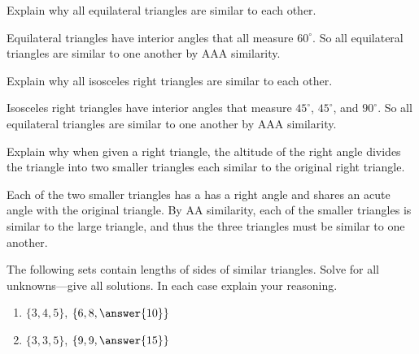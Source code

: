 \documentclass[nooutcomes]{ximera}
\begin{document}
\begin{question}
Explain why all equilateral triangles are similar to each other.
\begin{freeResponse}
\end{freeResponse}
\begin{hint}
Equilateral triangles have interior angles that all measure $60^\circ$.  So all equilateral triangles are similar to one another by AAA similarity.  
\end{hint}
\end{question}

\begin{question}Explain why all isosceles right triangles are similar to each other. 
\begin{freeResponse}
\end{freeResponse}
\begin{hint}
Isosceles right triangles have interior angles that measure $45^\circ$, $45^\circ$, and $90^\circ$.  So all equilateral triangles are similar to one another by AAA similarity.  
\end{hint}
\end{question}

\begin{question}
Explain why when given a right triangle, the altitude of the
  right angle divides the triangle into two smaller triangles each
  similar to the original right triangle.
\begin{freeResponse}
\end{freeResponse}
\begin{hint}
Each of the two smaller triangles has a has a right angle and shares an acute angle with the original triangle.  By AA similarity, each of the smaller triangles is similar to the large triangle, and thus the three triangles must be similar to one another.  
\end{hint}
\end{question}

\begin{question}
The following sets contain lengths of sides of similar
  triangles. Solve for all unknowns---give all solutions. In each case
  explain your reasoning.
\begin{enumerate}
\item $\{3,4,5\}$, $\{6,8,\answer{10}\}$
\item $\{3,3,5\}$, $\{9,9,\answer{15}\}$
\end{enumerate}
\end{question}
\end{document}
